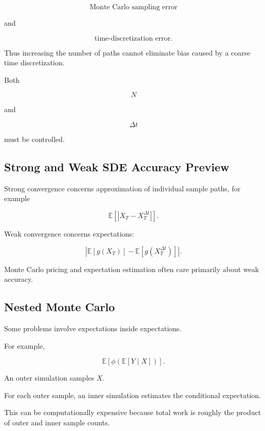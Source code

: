 \[
\boxed{
\text{Monte Carlo sampling error}
}
\]

and

\[
\boxed{
\text{time-discretization error}.
}
\]

Thus increasing the number of paths cannot eliminate bias caused by a
coarse time discretization.

Both

\[
N
\]

and

\[
\Delta t
\]

must be controlled.

\subsection{Strong and Weak SDE Accuracy Preview}
\label{subsec:strong-weak-sde}

Strong convergence concerns approximation of individual sample paths, for
example

\[
\boxed{
\mathbb{E}
[
|X_T-X_T^{\Delta t}|
].
}
\]

Weak convergence concerns expectations:

\[
\boxed{
\left|
\mathbb{E}[g(X_T)]
-
\mathbb{E}[g(X_T^{\Delta t})]
\right|.
}
\]

Monte Carlo pricing and expectation estimation often care primarily about
weak accuracy.

\subsection{Nested Monte Carlo}
\label{subsec:nested-monte-carlo}

Some problems involve expectations inside expectations.

For example,

\[
\boxed{
\mathbb{E}
\left[
\phi
\left(
\mathbb{E}
[
Y
\mid
X
]
\right)
\right].
}
\]

An outer simulation samples \(X\).

For each outer sample, an inner simulation estimates the conditional
expectation.

This can be computationally expensive because total work is roughly the
product of outer and inner sample counts.

